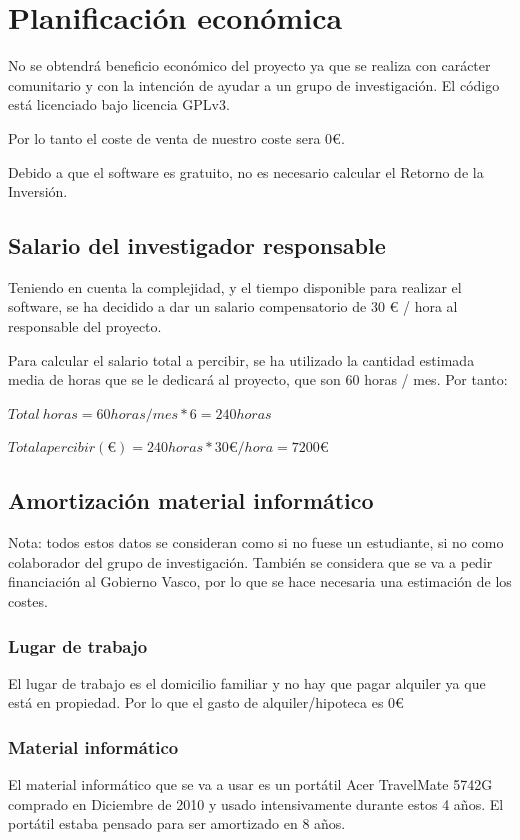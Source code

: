 \section{Planificaci\'{o}n econ\'{o}mica}
No se obtendr\'{a} beneficio econ\'{o}mico del proyecto ya que se realiza con car\'acter comunitario y con la intenci\'on
de ayudar a un grupo de investigaci\'on. El c\'odigo est\'a licenciado bajo licencia GPLv3.

Por lo tanto el coste de venta de nuestro coste sera 0€.

Debido a que el software es gratuito, no es necesario calcular el Retorno de la Inversi\'on.

\subsection{Salario del investigador responsable}
Teniendo en cuenta la complejidad, y el tiempo disponible para realizar el software, se ha
decidido a dar un salario compensatorio de 30 € / hora al responsable del proyecto.

Para calcular el salario total a percibir, se ha utilizado la cantidad estimada media de horas
que se le dedicar\'a al proyecto, que son 60 horas / mes.
Por tanto:

\begin{center}
	$ Total \ horas = 60 horas / mes * 6 = 240 horas $
	
	$ Total a percibir (€) = 240 horas * 30 € / hora = 7200 € $
\end{center}

\subsection{Amortizaci\'on material inform\'atico}
Nota: todos estos datos se consideran como si no fuese un estudiante, si no como colaborador
del grupo de investigaci\'on. Tambi\'en se considera que se va a pedir financiaci\'on al
Gobierno Vasco, por lo que se hace necesaria una estimaci\'on de los costes.

\subsubsection{Lugar de trabajo}
El lugar de trabajo es el domicilio familiar y no hay que pagar alquiler ya que est\'a en
propiedad. Por lo que el gasto de alquiler/hipoteca es 0€
\subsubsection{Material inform\'{a}tico}
El material informático que se va a usar es un portátil Acer TravelMate 5742G comprado en 
Diciembre de 2010 y usado intensivamente durante estos 4 años. 
El portátil estaba pensado para ser amortizado en 8 años.

